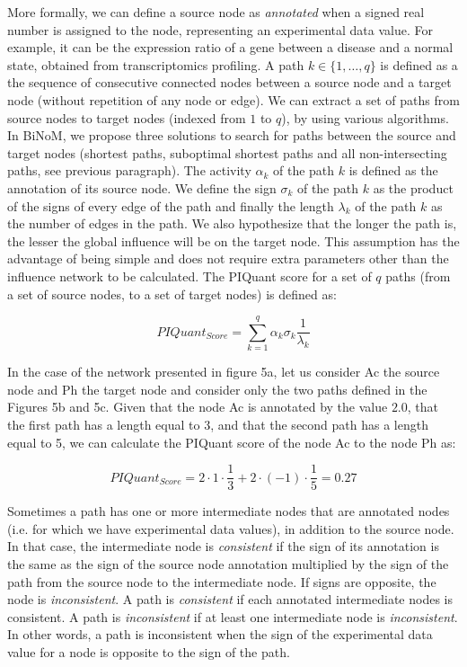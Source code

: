 \documentclass[10pt]{bmc_article}
\newenvironment{bmcformat}{\baselineskip20pt\sloppy\setboolean{publ}{false}}{\baselineskip20pt\sloppy}
\begin{document}
\begin{bmcformat}
More formally, we can define a source node as \textit{annotated} when a signed real
number is assigned to the node, representing an experimental data value. For example, it
can be the expression ratio of a gene between a disease and a normal state,
obtained from transcriptomics profiling.
 A path $k \in \{1,\ldots , q\}$ is defined
as a the sequence of consecutive connected nodes
between a source node and a target node (without repetition of any node
or edge). We can extract a set of paths from source nodes to target nodes (indexed
from $1$ to $q$), by using various algorithms. In BiNoM, we propose three solutions to search for paths between the
source and target nodes (shortest paths, suboptimal shortest paths and all
non-intersecting paths, see previous paragraph). The activity
$\alpha_k$ of the path $k$ is defined as the annotation
of its source node. We define the sign $\sigma_k$
of the path $k$ as the product of the signs of every edge of the path and finally
the length $\lambda_k$ of the path $k$ as the number of edges in the path. We also
hypothesize that the longer the path is, the lesser the global influence will be
on the target node. This assumption has the advantage of being simple and does
not require extra parameters other than the influence network to be calculated.
The PIQuant score for a set of $q$ paths (from a set of source nodes, to a set
of target nodes) is defined as:

$$
 PIQuant_{Score} = \sum_{k=1}^{q} \alpha_{k} \sigma_{k} \frac{1}{\lambda_{k}}
$$

In the case of the network presented in figure 5a, let us
consider Ac the source node and Ph the target node and consider only the two
paths defined in the Figures 5b and
5c. Given that the
node Ac is annotated by the value $2.0$, that the first path has a length
equal to 3, and that the second path has a length equal to 5, we can calculate the PIQuant score
of the node Ac to the node Ph as:

$$
 PIQuant_{Score} = 2 \cdot 1 \cdot \frac{1}{3} + 2 \cdot (-1) \cdot \frac{1}{5}
= 0.27
$$


Sometimes a path has one or more intermediate nodes that are annotated nodes
(i.e. for which we have experimental data values),
in addition to the source node.
In that case, the intermediate node is \textit{consistent} if the sign of its
annotation is the same as the sign of the source node annotation multiplied by
the sign of the
path from the source node to the intermediate node. If signs are opposite, the
node is \textit{inconsistent}.
A path is \textit{consistent} if each annotated intermediate nodes is
consistent. A path is \textit{inconsistent} if at least one intermediate node is
\textit{inconsistent}.
In other words, a path is inconsistent when the
sign of the experimental data value for a node is opposite to the sign
of the path.


\end{bmcformat}
\end{document}
